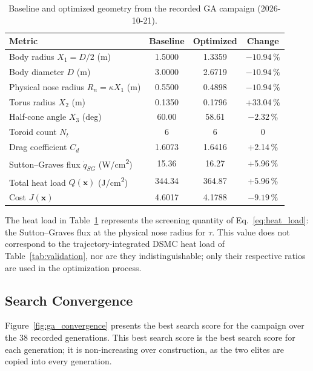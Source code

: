\begin{table}[H]
    \centering
    \caption{Baseline and optimized geometry from the recorded GA campaign (2026-10-21).}
    \label{tab:ga_before_after}
    \begin{tabular}{lccc}
        \toprule
        \textbf{Metric} & \textbf{Baseline} & \textbf{Optimized} & \textbf{Change} \\
        \midrule
        Body radius $X_1 = D/2$ (m) & 1.5000 & 1.3359 & $-10.94\,\%$ \\
        Body diameter $D$ (m) & 3.0000 & 2.6719 & $-10.94\,\%$ \\
        Physical nose radius $R_n=\kappa X_1$ (m) & 0.5500 & 0.4898 & $-10.94\,\%$ \\
        Torus radius $X_2$ (m) & 0.1350 & 0.1796 & +33.04\,\% \\
        Half-cone angle $X_3$ (deg) & 60.00 & 58.61 & $-2.32\,\%$ \\
        Toroid count $N_t$ & 6 & 6 & 0 \\
        Drag coefficient $C_d$ & 1.6073 & 1.6416 & +2.14\,\% \\
        Sutton--Graves flux $\dot{q}_{SG}$ (W/cm\textsuperscript{2}) & 15.36 & 16.27 & +5.96\,\% \\
        Total heat load $Q(\mathbf{x})$ (J/cm\textsuperscript{2}) & 344.34 & 364.87 & +5.96\,\% \\
        Cost $J(\mathbf{x})$ & 4.6017 & 4.1788 & $-9.19\,\%$ \\
        \bottomrule
    \end{tabular}
\end{table}

The heat load in Table~\ref{tab:ga_before_after} represents the screening quantity of Eq.~\eqref{eq:heat_load}: the Sutton--Graves flux at the physical nose radius for $\tau$. This value does not correspond to the trajectory-integrated DSMC heat load of Table~\ref{tab:validation}, nor are they indistinguishable; only their respective ratios are used in the optimization process.

\subsection{Search Convergence}
Figure~\ref{fig:ga_convergence} presents the best search score for the campaign over the 38 recorded generations. This best search score is the best search score for each generation; it is non-increasing over construction, as the two elites are copied into every generation.

